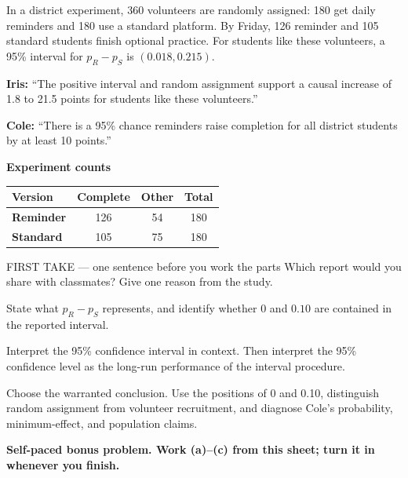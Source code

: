 \documentclass[14pt]{extarticle}
\begin{document}
\pagestyle{empty}


\noindent\begin{minipage}[t]{0.57\linewidth}
\vspace{0pt}
In a district experiment, 360 volunteers are randomly assigned: 180 get daily reminders and 180 use a standard platform. By Friday, 126 reminder and 105 standard students finish optional practice. For students like these volunteers, a 95\% interval for $p_R-p_S$ is $(0.018,0.215)$.\par\smallskip \textbf{Iris:} ``The positive interval and random assignment support a causal increase of 1.8 to 21.5 points for students like these volunteers.''\par \textbf{Cole:} ``There is a 95\% chance reminders raise completion for all district students by at least 10 points.''\par
\end{minipage}\hfill
\begin{minipage}[t]{0.40\linewidth}
\vspace{0pt}
\begin{center}
\textbf{Experiment counts}\par\smallskip
\begin{tabular}{|l|c|c|c|}
\hline
\textbf{Version} & \textbf{Complete} & \textbf{Other} & \textbf{Total} \\ \hline
\textbf{Reminder} & 126 & 54 & 180 \\ \hline
\textbf{Standard} & 105 & 75 & 180 \\ \hline
\end{tabular}
\end{center}
\end{minipage}

\begin{firsttakebox}{FIRST TAKE --- one sentence before you work the parts}
Which report would you share with classmates? Give one reason from the study.
\end{firsttakebox}

\begin{description}[leftmargin=1.15in, labelwidth=1in, itemsep=2pt, topsep=2pt]
  \item[\dokbadge{1}~(a)] State what $p_R-p_S$ represents, and identify whether $0$ and $0.10$ are contained in the reported interval.
  \item[\dokbadge{2}~(b)] Interpret the 95\% confidence interval in context. Then interpret the 95\% confidence level as the long-run performance of the interval procedure.
  \item[\dokbadge{3}~(c)] Choose the warranted conclusion. Use the positions of 0 and 0.10, distinguish random assignment from volunteer recruitment, and diagnose Cole's probability, minimum-effect, and population claims.
\end{description}

\vfill
\textbf{Self-paced bonus problem. Work (a)--(c) from this sheet; turn it in whenever you finish.}
\end{document}

